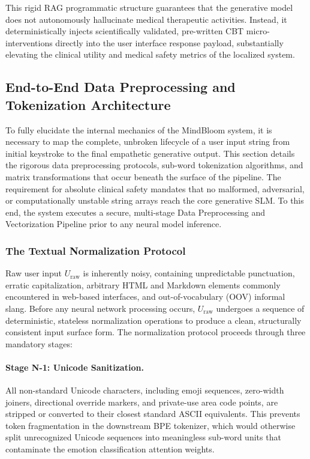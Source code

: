 \documentclass[12pt,twoside]{article}
\begin{document}
This rigid RAG programmatic structure guarantees that the generative model does not autonomously hallucinate medical therapeutic activities. Instead, it deterministically injects scientifically validated, pre-written CBT micro-interventions directly into the user interface response payload, substantially elevating the clinical utility and medical safety metrics of the localized system.

\subsection{End-to-End Data Preprocessing and Tokenization Architecture}

To fully elucidate the internal mechanics of the MindBloom system, it is necessary to map the complete, unbroken lifecycle of a user input string from initial keystroke to the final empathetic generative output. This section details the rigorous data preprocessing protocols, sub-word tokenization algorithms, and matrix transformations that occur beneath the surface of the pipeline. The requirement for absolute clinical safety mandates that no malformed, adversarial, or computationally unstable string arrays reach the core generative SLM. To this end, the system executes a secure, multi-stage Data Preprocessing and Vectorization Pipeline prior to any neural model inference.

\subsubsection{The Textual Normalization Protocol}

Raw user input $U_{\text{raw}}$ is inherently noisy, containing unpredictable punctuation, erratic capitalization, arbitrary HTML and Markdown elements commonly encountered in web-based interfaces, and out-of-vocabulary (OOV) informal slang. Before any neural network processing occurs, $U_{\text{raw}}$ undergoes a sequence of deterministic, stateless normalization operations to produce a clean, structurally consistent input surface form. The normalization protocol proceeds through three mandatory stages:

\paragraph{Stage N-1: Unicode Sanitization.}
All non-standard Unicode characters, including emoji sequences, zero-width joiners, directional override markers, and private-use area code points, are stripped or converted to their closest standard ASCII equivalents. This prevents token fragmentation in the downstream BPE tokenizer, which would otherwise split unrecognized Unicode sequences into meaningless sub-word units that contaminate the emotion classification attention weights.
\end{document}
